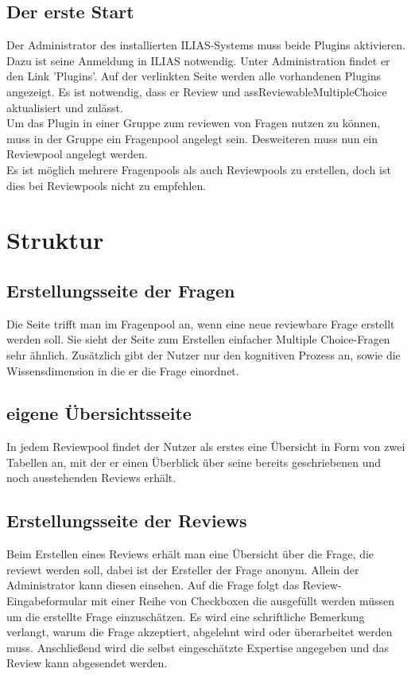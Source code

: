 \documentclass[12pt,a4paper]{scrreprt}
\begin{document}
\section{Der erste Start}
Der Administrator des installierten ILIAS-Systems muss beide Plugins aktivieren. Dazu ist seine Anmeldung in ILIAS notwendig. Unter Administration findet er den Link 'Plugins'. Auf der verlinkten Seite werden alle vorhandenen Plugins angezeigt. Es ist notwendig, dass er Review und assReviewableMultipleChoice aktualisiert und zulässt. \\
	Um das Plugin in einer Gruppe zum reviewen von Fragen nutzen zu können, muss in der Gruppe ein Fragenpool angelegt sein. Desweiteren muss nun ein Reviewpool angelegt werden.\\
	Es ist möglich mehrere Fragenpools als auch Reviewpools zu erstellen, doch ist dies bei Reviewpools nicht zu empfehlen. 

\chapter{Struktur}

\section{Erstellungsseite der Fragen}
Die Seite trifft man im Fragenpool an, wenn eine neue reviewbare Frage erstellt werden soll. Sie sieht der Seite zum Erstellen einfacher Multiple Choice-Fragen sehr ähnlich. Zusätzlich gibt der Nutzer nur den kognitiven Prozess an, sowie die Wissensdimension in die er die Frage einordnet. 

\section{eigene \"Ubersichtsseite}
In jedem Reviewpool findet der Nutzer als erstes eine Übersicht in Form von zwei Tabellen an, mit der er einen Überblick über seine bereits geschriebenen und noch ausstehenden Reviews erhält. 	

\section{Erstellungsseite der Reviews}
Beim Erstellen eines Reviews erhält man eine Übersicht über die Frage, die reviewt werden soll, dabei ist der Ersteller der Frage anonym. Allein der Administrator kann diesen einsehen.
Auf die Frage folgt das Review-Eingabeformular mit einer Reihe von Checkboxen die ausgefüllt werden müssen um die erstellte Frage einzuschätzen. Es wird eine schriftliche Bemerkung verlangt, warum die Frage akzeptiert, abgelehnt wird oder überarbeitet werden muss.
Anschließend wird die selbst eingeschätzte Expertise angegeben und das Review kann abgesendet werden.
\end{document}
